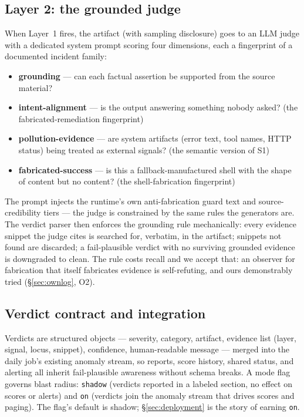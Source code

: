\documentclass[11pt]{article}
\begin{document}
\subsection{Layer 2: the grounded judge}
\label{sec:layer2}

When Layer~1 fires, the artifact (with sampling disclosure) goes to an
LLM judge with a dedicated system prompt scoring four dimensions, each
a fingerprint of a documented incident family:

\begin{itemize}
\item \textbf{grounding} --- can each factual assertion be supported
  from the source material?
\item \textbf{intent-alignment} --- is the output answering something
  nobody asked? (the fabricated-remediation fingerprint)
\item \textbf{pollution-evidence} --- are system artifacts (error text,
  tool names, HTTP status) being treated as external signals? (the
  semantic version of S1)
\item \textbf{fabricated-success} --- is this a fallback-manufactured
  shell with the shape of content but no content? (the
  shell-fabrication fingerprint)
\end{itemize}

The prompt injects the runtime's own anti-fabrication guard text and
source-credibility tiers --- the judge is constrained by the same rules
the generators are. The verdict parser then enforces the grounding rule
mechanically: every evidence snippet the judge cites is searched for,
verbatim, in the artifact; snippets not found are discarded; a
fail-plausible verdict with no surviving grounded evidence is
downgraded to clean. The rule costs recall and we accept that: an
observer for fabrication that itself fabricates evidence is
self-refuting, and ours demonstrably tried (\S\ref{sec:ownlog}, O2).

\subsection{Verdict contract and integration}

Verdicts are structured objects --- severity, category, artifact,
evidence list (layer, signal, locus, snippet), confidence,
human-readable message --- merged into the daily job's existing anomaly
stream, so reports, score history, shared status, and alerting all
inherit fail-plausible awareness without schema breaks. A mode flag
governs blast radius: \texttt{shadow} (verdicts reported in a labeled
section, no effect on scores or alerts) and \texttt{on} (verdicts join
the anomaly stream that drives scores and paging). The flag's default
is shadow; \S\ref{sec:deployment} is the story of earning \texttt{on}.
\end{document}
